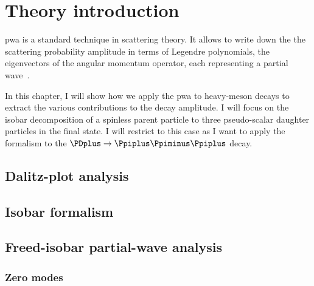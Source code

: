 \chapter{Theory introduction}

    \Ac{pwa} is a standard technique in scattering theory.
    It allows to write down the the scattering probability amplitude in terms of Legendre polynomials, the eigenvectors of the angular momentum operator, each representing a partial wave~\cite[\S~11.2]{griffiths_intro_qm}.


    In this chapter, I will show how we apply the \ac{pwa} to heavy-meson decays to extract the various contributions to the decay amplitude.
    I will focus on the isobar decomposition of a spinless parent particle to three pseudo-scalar daughter particles in the final state.
    I will restrict to this case as I want to apply the formalism to the $\PDplus\to\Ppiplus\Ppiminus\Ppiplus$ decay.

    

%        


    \section{Dalitz-plot analysis}
    


    \section{Isobar formalism}
    

    \section{Freed-isobar partial-wave analysis}
    

        \subsection{Zero modes}
        

